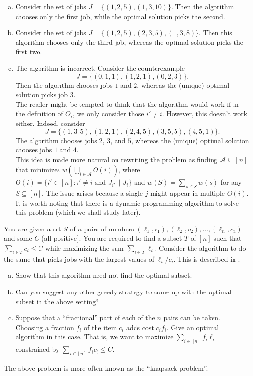 \begin{solution*}
	\begin{enumerate}[(a)]
		\item Consider the set of jobs $J=\{(1,2,5),(1,3,10)\}$. Then the algorithm chooses only the first job, while the optimal solution picks the second.
		
		\item Consider the set of jobs $J=\{(1,2,5),(2,3,5),(1,3,8)\}$. Then this algorithm chooses only the third job, whereas the optimal solution picks the first two.
		
		\item The algorithm is incorrect. Consider the counterexample
		\[ J = \{(0,1,1),(1,2,1),(0,2,3)\}. \]
		Then the algorithm chooses jobs $1$ and $2$, whereas the (unique) optimal solution picks job $3$.\\
		The reader might be tempted to think that the algorithm would work if in the definition of $O_i$, we only consider those $i'\neq i$. However, this doesn't work either. Indeed, consider
		\[ J = \{(1,3,5),(1,2,1),(2,4,5),(3,5,5),(4,5,1)\}. \]
		The algorithm chooses jobs $2$, $3$, and $5$, whereas the (unique) optimal solution chooses jobs $1$ and $4$.\\
		This idea is made more natural on rewriting the problem as finding $\mathcal{A}\subseteq[n]$ that minimizes $w\left(\bigcup_{i\in\mathcal{A}} O(i)\right)$,	where $O(i) = \{i'\in[n] : i'\neq i\text{ and }J_{i'}\|J_i\}$ and $w(S)=\sum_{s\in S}w(s)$ for any $S\subseteq[n]$. The issue arises because a single $j$ might appear in multiple $O(i)$. It is worth noting that there is a dynamic programming algorithm to solve this problem (which we shall study later).
	\end{enumerate}
\end{solution*}

\begin{exercise}
	You are given a set $S$ of $n$ pairs of numbers $(\ell_1,c_1),(\ell_2,c_2),\ldots,(\ell_n,c_n)$ and some $C$ (all positive). You are required to find a subset $T$ of $[n]$ such that $\sum_{i\in T} c_i \leq C$ while maximizing the sum $\sum_{i\in T}\ell_i$. Consider the algorithm to do the same that picks jobs with the largest values of $\ell_i/c_i$. This is described in .
	\begin{enumerate}[(a)]
		\item Show that this algorithm need not find the optimal subset.
		\item Can you suggest any other greedy strategy to come up with the optimal subset in the above setting?
		\item Suppose that a ``fractional'' part of each of the $n$ pairs can be taken. Choosing a fraction $f_i$ of the item $c_i$ adds cost $c_i f_i$. Give an optimal algorithm in this case. That is, we want to maximize $\sum_{i\in [n]} f_i \ell_i$ constrained by $\sum_{i\in[n]} f_i c_i \leq C$.
	\end{enumerate}
	The above problem is more often known as the ``knapsack problem''.
\end{exercise}

